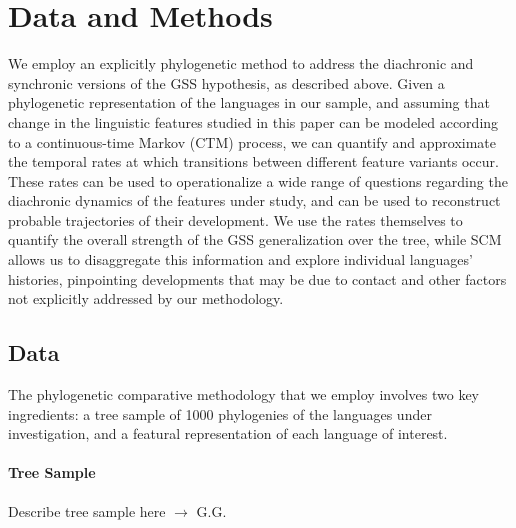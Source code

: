 \documentclass[11pt]{article}
\begin{document}
\section{Data and Methods} \label{methods}

We employ an explicitly phylogenetic method to address the diachronic and synchronic versions of the GSS hypothesis, as described above. Given a phylogenetic representation of the languages in our sample, and assuming that change in the linguistic features studied in this paper can be modeled according to a continuous-time Markov (CTM) process, we can quantify and approximate the temporal rates at which transitions between different feature variants occur. These rates can be used to operationalize a wide range of questions regarding the diachronic dynamics of the features under study, and can be used to reconstruct probable trajectories of their development. 
We use the rates themselves to quantify the overall strength of the GSS generalization over the tree, while SCM allows us to disaggregate this information and explore individual languages' histories, pinpointing developments that may be due to contact and other factors not explicitly addressed by our methodology.

\subsection{Data}

The phylogenetic comparative methodology that we employ involves two key ingredients: a tree sample of 1000 phylogenies of the languages under investigation, and a featural representation of each language of interest.


\paragraph{Tree Sample}
{\color{purple}

Describe tree sample here $\rightarrow$ G.G.

}
\end{document}
